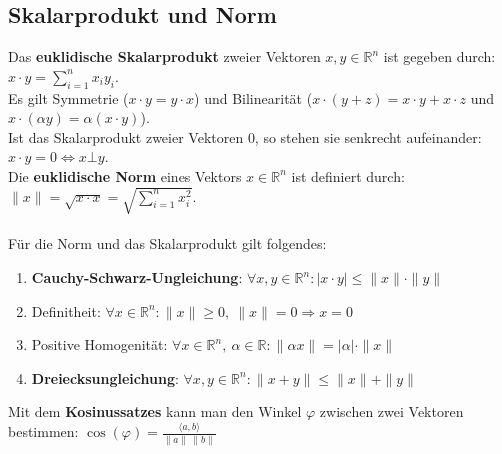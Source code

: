 \documentclass[a4paper,10pt]{scrartcl}
\begin{document}
\subsection{Skalarprodukt und Norm}
Das \textbf{euklidische Skalarprodukt} zweier Vektoren $x,y\in \mathbb{R}^n$ ist gegeben durch: $x\cdot y = \sum_{i=1}^{n} x_iy_i$.\\
Es gilt Symmetrie ($x\cdot y = y\cdot x$) und Bilinearität ($x\cdot (y+z)=x\cdot y + x \cdot z$ und $x\cdot (\alpha y) = \alpha (x\cdot y)$).\\
Ist das Skalarprodukt zweier Vektoren 0, so stehen sie senkrecht aufeinander: $x\cdot y= 0 \Leftrightarrow x\bot y$.\\
Die \textbf{euklidische Norm} eines Vektors $x\in \mathbb{R}^n$ ist definiert durch:  $\|x\|=\sqrt{x\cdot x} = \sqrt{\sum_{i=1}^{n} x_i^2}$. \\\\
Für die Norm und das Skalarprodukt gilt folgendes:
\begin{enumerate}[label= $\circ$]
	\item \textbf{Cauchy-Schwarz-Ungleichung}: $\forall x,y \in \mathbb{R}^n: |x\cdot y| \leq \|x\| \cdot \|y\|$ 
	\item Definitheit: $\forall x \in \mathbb{R}^n: \|x\|\geq 0,\ \|x\|=0\Rightarrow x=0$
	\item Positive Homogenität: $\forall x\in \mathbb{R}^n, \ \alpha \in \mathbb{R} : \|\alpha x\| = |\alpha|\cdot \|x\|$
	\item \textbf{Dreiecksungleichung}: $\forall x,y\in \mathbb{R}^n : \|x+y\| \leq \|x\|+\|y\|$ 
\end{enumerate}
Mit dem \textbf{Kosinussatzes} kann man den Winkel $\varphi$ zwischen zwei Vektoren bestimmen: $\cos(\varphi)={\frac {\langle a,b\rangle }{\|a\|\,\|b\|}}$
\end{document}
